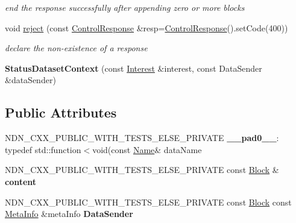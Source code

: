 \begin{DoxyCompactItemize}
\begin{DoxyCompactList}\small\item\em end the response successfully after appending zero or more blocks \end{DoxyCompactList}\item 
void \hyperlink{classndn_1_1mgmt_1_1StatusDatasetContext_ae232aab334b4601b12dc947b84556e7d}{reject} (const \hyperlink{classndn_1_1mgmt_1_1ControlResponse}{Control\+Response} \&resp=\hyperlink{classndn_1_1mgmt_1_1ControlResponse}{Control\+Response}().set\+Code(400))
\begin{DoxyCompactList}\small\item\em declare the non-\/existence of a response \end{DoxyCompactList}\item 
{\bfseries Status\+Dataset\+Context} (const \hyperlink{classndn_1_1Interest}{Interest} \&interest, const Data\+Sender \&data\+Sender)\hypertarget{classndn_1_1mgmt_1_1StatusDatasetContext_a5fc6614afc8fff24f7073b91d402fa40}{}\label{classndn_1_1mgmt_1_1StatusDatasetContext_a5fc6614afc8fff24f7073b91d402fa40}

\end{DoxyCompactItemize}
\subsection*{Public Attributes}
\begin{DoxyCompactItemize}
\item 
N\+D\+N\+\_\+\+C\+X\+X\+\_\+\+P\+U\+B\+L\+I\+C\+\_\+\+W\+I\+T\+H\+\_\+\+T\+E\+S\+T\+S\+\_\+\+E\+L\+S\+E\+\_\+\+P\+R\+I\+V\+A\+TE {\bfseries \+\_\+\+\_\+pad0\+\_\+\+\_\+}\+: typedef std\+::function$<$void(const \hyperlink{classndn_1_1Name}{Name}\& data\+Name\hypertarget{classndn_1_1mgmt_1_1StatusDatasetContext_a9929579db22364753bcfbfe027e62b8e}{}\label{classndn_1_1mgmt_1_1StatusDatasetContext_a9929579db22364753bcfbfe027e62b8e}

\item 
N\+D\+N\+\_\+\+C\+X\+X\+\_\+\+P\+U\+B\+L\+I\+C\+\_\+\+W\+I\+T\+H\+\_\+\+T\+E\+S\+T\+S\+\_\+\+E\+L\+S\+E\+\_\+\+P\+R\+I\+V\+A\+TE const \hyperlink{classndn_1_1Block}{Block} \& {\bfseries content}\hypertarget{classndn_1_1mgmt_1_1StatusDatasetContext_ad587f2ad45fc3bd4e46a906a485e7588}{}\label{classndn_1_1mgmt_1_1StatusDatasetContext_ad587f2ad45fc3bd4e46a906a485e7588}

\item 
N\+D\+N\+\_\+\+C\+X\+X\+\_\+\+P\+U\+B\+L\+I\+C\+\_\+\+W\+I\+T\+H\+\_\+\+T\+E\+S\+T\+S\+\_\+\+E\+L\+S\+E\+\_\+\+P\+R\+I\+V\+A\+TE const \hyperlink{classndn_1_1Block}{Block} const \hyperlink{classndn_1_1MetaInfo}{Meta\+Info} \&meta\+Info {\bfseries Data\+Sender}\hypertarget{classndn_1_1mgmt_1_1StatusDatasetContext_abe730f60b33a43974a35deb495ae264d}{}\label{classndn_1_1mgmt_1_1StatusDatasetContext_abe730f60b33a43974a35deb495ae264d}

\end{DoxyCompactItemize}
